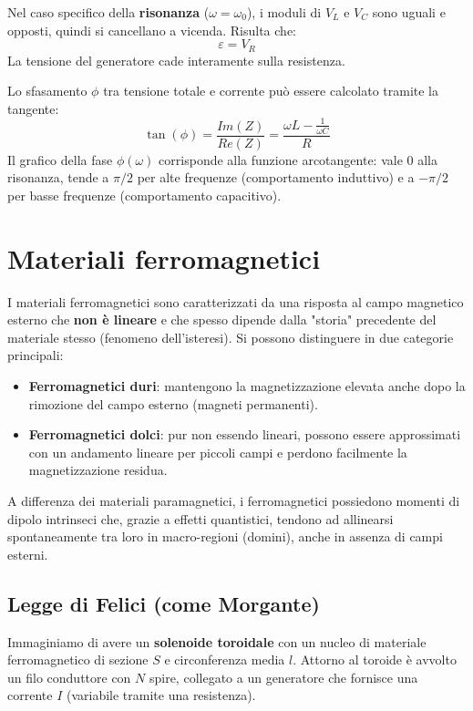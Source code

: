 \documentclass{book}
\begin{document}
Nel caso specifico della  \textbf{risonanza} ($\omega = \omega_0$), i moduli di $V_L$ e $V_C$ sono uguali e opposti, quindi si cancellano a vicenda. Risulta che:
$$ \varepsilon = V_R $$
La tensione del generatore cade interamente sulla resistenza.

Lo sfasamento $\phi$ tra tensione totale e corrente può essere calcolato tramite la tangente:
$$ \tan(\phi) = \frac{Im(Z)}{Re(Z)} = \frac{\omega L - \frac{1}{\omega C}}{R} $$
Il grafico della fase $\phi(\omega)$ corrisponde alla funzione arcotangente: vale 0 alla risonanza, tende a $\pi/2$ per alte frequenze (comportamento induttivo) e a $-\pi/2$ per basse frequenze (comportamento capacitivo).



\chapter{Materiali ferromagnetici}

I materiali ferromagnetici sono caratterizzati da una risposta al campo magnetico esterno che \textbf{non è lineare} e che spesso dipende dalla "storia" precedente del materiale stesso (fenomeno dell'isteresi). Si possono distinguere in due categorie principali:
\begin{itemize}
    \item \textbf{Ferromagnetici duri}: mantengono la magnetizzazione elevata anche dopo la rimozione del campo esterno (magneti permanenti).
    \item \textbf{Ferromagnetici dolci}: pur non essendo lineari, possono essere approssimati con un andamento lineare per piccoli campi e perdono facilmente la magnetizzazione residua.
\end{itemize}

A differenza dei materiali paramagnetici, i ferromagnetici possiedono momenti di dipolo intrinseci che, grazie a effetti quantistici, tendono ad allinearsi spontaneamente tra loro in macro-regioni (domini), anche in assenza di campi esterni.

\section{Legge di Felici (come Morgante)}

Immaginiamo di avere un \textbf{solenoide toroidale} con un nucleo di materiale ferromagnetico di sezione $S$ e circonferenza media $l$. Attorno al toroide è avvolto un filo conduttore con $N$ spire, collegato a un generatore che fornisce una corrente $I$ (variabile tramite una resistenza).
\end{document}

